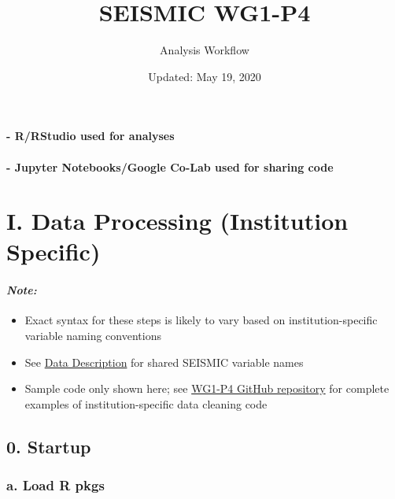 \documentclass[]{article}
\title{SEISMIC WG1-P4}
\subtitle{Analysis Workflow}
\author{}
\date{\vspace{-2.5em}Updated: May 19, 2020}
\providecommand{\tightlist}{%
  \setlength{\itemsep}{0pt}\setlength{\parskip}{0pt}}
\let\oldparagraph\paragraph
\renewcommand{\paragraph}[1]{\oldparagraph{#1}\mbox{}}
\begin{document}
\maketitle

{
\setcounter{tocdepth}{2}
\tableofcontents
}
\paragraph{- R/RStudio used for
analyses}\label{rrstudio-used-for-analyses}

\paragraph{- Jupyter Notebooks/Google Co-Lab used for sharing
code}\label{jupyter-notebooksgoogle-co-lab-used-for-sharing-code}

\section{\texorpdfstring{\textbf{I. Data Processing (Institution
Specific)}}{I. Data Processing (Institution Specific)}}\label{i.-data-processing-institution-specific}

\paragraph{\texorpdfstring{\emph{Note:}}{Note:}}\label{note}

\begin{itemize}
\tightlist
\item
  Exact syntax for these steps is likely to vary based on
  institution-specific variable naming conventions
\item
  See
  \href{https://docs.google.com/spreadsheets/d/1SzU4PcIEUsAGnKKyAcugHO2O2aZW29sf9a_cC-FAElk/edit\#gid=1679989021}{Data
  Description} for shared SEISMIC variable names
\item
  Sample code only shown here; see
  \href{https://github.com/seismic2020/WG1-P4}{WG1-P4 GitHub repository}
  for complete examples of institution-specific data cleaning code
\end{itemize}

\subsection{0. Startup}\label{startup}

\subsubsection{a. Load R pkgs}\label{a.-load-r-pkgs}
\end{document}
